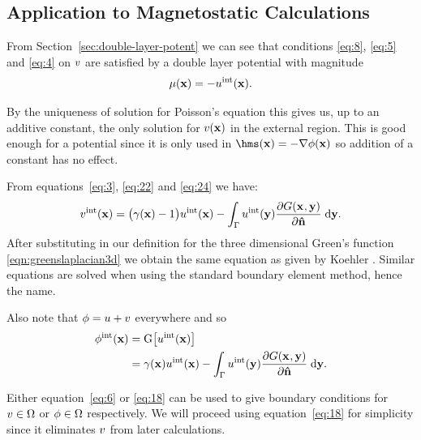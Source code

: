 \subsection{Application to Magnetostatic Calculations}
\label{sec:appl-magn-calc}

From Section~\ref{sec:double-layer-potent} we can see that conditions \eqref{eq:8}, \eqref{eq:5} and \eqref{eq:4} on $v$ are satisfied by a double layer potential with magnitude
\begin{equation}
  \label{eq:24}
  \mu(\mathbf{x}) = - u^{\text{int}}(\mathbf{x}).
\end{equation}

By the uniqueness of solution for Poisson's equation this gives us, up to an additive constant, the only solution for $v(\mathbf{x})$ in the external region.
This is good enough for a potential since it is only used in $\hms(\xv) = - \nabla \phim(\xv)$ so addition of a constant has no effect.

From equations~\eqref{eq:3}, \eqref{eq:22} and \eqref{eq:24} we have:
\begin{equation}
  \label{eq:6}
  v^{\text{int}}(\mathbf{x}) =  \big(\gamma(\mathbf{x}) - 1 \big) u^{\text{int}}(\mathbf{x})
  - \int_{{\Gamma}} u^{\text{int}}(\mathbf{y}) \frac{\partial G(\mathbf{x}_{},\mathbf{y})}{\partial \mathbf{\hat{n}}} {\; \text{d}} \mathbf{y}.
\end{equation}
After substituting in our definition for the three dimensional Green's function \eqref{eqn:greenslaplacian3d} we obtain the same equation as given by Koehler \cite{Koehler1997}.
Similar equations are solved when using the standard boundary element method, hence the name.

Also note that $\phi = u + v$ everywhere and so
\begin{align}
  \label{eq:18}
  \phi^{\text{int}}(\mathbf{x}) &= {\mathbf{\mathrm{G}}} \big[ u^{\text{int}}(\mathbf{x}) \big] \\
  &= \gamma(\mathbf{x}) u^{\text{int}}(\mathbf{x})
  - \int_{{\Gamma}} u^{\text{int}}(\mathbf{y}) \frac{\partial G(\mathbf{x}_{},\mathbf{y})}{\partial \mathbf{\hat{n}}} {\; \text{d}} \mathbf{y}. \notag
\end{align}

Either equation~\eqref{eq:6} or \eqref{eq:18} can be used to give boundary conditions for $v \in \Omega$ or $\phi \in \Omega$ respectively. We will proceed using equation~\eqref{eq:18} for simplicity since it eliminates $v$ from later calculations.


